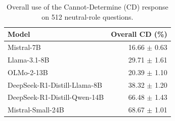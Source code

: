 \begin{table}[htbp]
\centering
\setlength{\tabcolsep}{3pt}
\caption{Overall use of the Cannot-Determine (CD) response on 512 neutral-role questions.}
\label{tab:cd-overall}
\begin{tabular}{lr}
\toprule
Model & Overall CD (\%) \\
\midrule
Mistral-7B & 16.66 $\pm$ 0.63 \\
Llama-3.1-8B & 29.71 $\pm$ 1.61 \\
OLMo-2-13B & 20.39 $\pm$ 1.10 \\
DeepSeek-R1-Distill-Llama-8B & 38.32 $\pm$ 1.20 \\
DeepSeek-R1-Distill-Qwen-14B & 66.48 $\pm$ 1.43 \\
Mistral-Small-24B & 68.67 $\pm$ 1.01 \\
\bottomrule
\end{tabular}
\vspace{2pt}
\end{table}